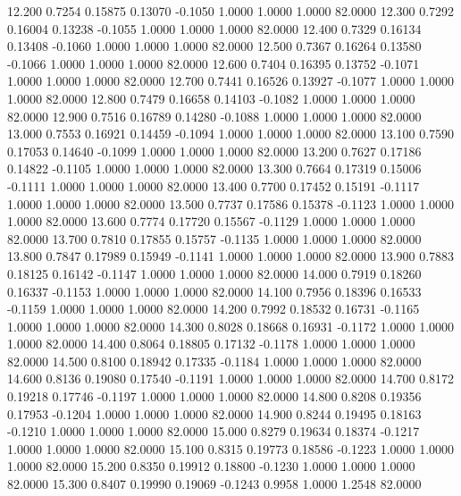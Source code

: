   12.200   0.7254   0.15875   0.13070  -0.1050   1.0000   1.0000   1.0000  82.0000
  12.300   0.7292   0.16004   0.13238  -0.1055   1.0000   1.0000   1.0000  82.0000
  12.400   0.7329   0.16134   0.13408  -0.1060   1.0000   1.0000   1.0000  82.0000
  12.500   0.7367   0.16264   0.13580  -0.1066   1.0000   1.0000   1.0000  82.0000
  12.600   0.7404   0.16395   0.13752  -0.1071   1.0000   1.0000   1.0000  82.0000
  12.700   0.7441   0.16526   0.13927  -0.1077   1.0000   1.0000   1.0000  82.0000
  12.800   0.7479   0.16658   0.14103  -0.1082   1.0000   1.0000   1.0000  82.0000
  12.900   0.7516   0.16789   0.14280  -0.1088   1.0000   1.0000   1.0000  82.0000
  13.000   0.7553   0.16921   0.14459  -0.1094   1.0000   1.0000   1.0000  82.0000
  13.100   0.7590   0.17053   0.14640  -0.1099   1.0000   1.0000   1.0000  82.0000
  13.200   0.7627   0.17186   0.14822  -0.1105   1.0000   1.0000   1.0000  82.0000
  13.300   0.7664   0.17319   0.15006  -0.1111   1.0000   1.0000   1.0000  82.0000
  13.400   0.7700   0.17452   0.15191  -0.1117   1.0000   1.0000   1.0000  82.0000
  13.500   0.7737   0.17586   0.15378  -0.1123   1.0000   1.0000   1.0000  82.0000
  13.600   0.7774   0.17720   0.15567  -0.1129   1.0000   1.0000   1.0000  82.0000
  13.700   0.7810   0.17855   0.15757  -0.1135   1.0000   1.0000   1.0000  82.0000
  13.800   0.7847   0.17989   0.15949  -0.1141   1.0000   1.0000   1.0000  82.0000
  13.900   0.7883   0.18125   0.16142  -0.1147   1.0000   1.0000   1.0000  82.0000
  14.000   0.7919   0.18260   0.16337  -0.1153   1.0000   1.0000   1.0000  82.0000
  14.100   0.7956   0.18396   0.16533  -0.1159   1.0000   1.0000   1.0000  82.0000
  14.200   0.7992   0.18532   0.16731  -0.1165   1.0000   1.0000   1.0000  82.0000
  14.300   0.8028   0.18668   0.16931  -0.1172   1.0000   1.0000   1.0000  82.0000
  14.400   0.8064   0.18805   0.17132  -0.1178   1.0000   1.0000   1.0000  82.0000
  14.500   0.8100   0.18942   0.17335  -0.1184   1.0000   1.0000   1.0000  82.0000
  14.600   0.8136   0.19080   0.17540  -0.1191   1.0000   1.0000   1.0000  82.0000
  14.700   0.8172   0.19218   0.17746  -0.1197   1.0000   1.0000   1.0000  82.0000
  14.800   0.8208   0.19356   0.17953  -0.1204   1.0000   1.0000   1.0000  82.0000
  14.900   0.8244   0.19495   0.18163  -0.1210   1.0000   1.0000   1.0000  82.0000
  15.000   0.8279   0.19634   0.18374  -0.1217   1.0000   1.0000   1.0000  82.0000
  15.100   0.8315   0.19773   0.18586  -0.1223   1.0000   1.0000   1.0000  82.0000
  15.200   0.8350   0.19912   0.18800  -0.1230   1.0000   1.0000   1.0000  82.0000
  15.300   0.8407   0.19990   0.19069  -0.1243   0.9958   1.0000   1.2548  82.0000
